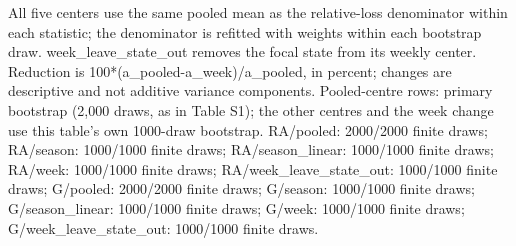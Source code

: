 \vspace{-.5\baselineskip}
\begin{minipage}{\linewidth}\footnotesize\raggedright
All five centers use the same pooled mean as the relative-loss denominator within each statistic; the denominator is refitted with weights within each bootstrap draw. week\_\allowbreak{}leave\_\allowbreak{}state\_\allowbreak{}out removes the focal state from its weekly center. Reduction is 100*(a\_\allowbreak{}pooled-a\_\allowbreak{}week)/a\_\allowbreak{}pooled, in percent; changes are descriptive and not additive variance components. Pooled-centre rows: primary bootstrap (2,000 draws, as in Table S1); the other centres and the week change use this table's own 1000-draw bootstrap. RA/pooled: 2000/2000 finite draws; RA/season: 1000/1000 finite draws; RA/season\_\allowbreak{}linear: 1000/1000 finite draws; RA/week: 1000/1000 finite draws; RA/week\_\allowbreak{}leave\_\allowbreak{}state\_\allowbreak{}out: 1000/1000 finite draws; G/pooled: 2000/2000 finite draws; G/season: 1000/1000 finite draws; G/season\_\allowbreak{}linear: 1000/1000 finite draws; G/week: 1000/1000 finite draws; G/week\_\allowbreak{}leave\_\allowbreak{}state\_\allowbreak{}out: 1000/1000 finite draws.
\end{minipage}\par
\endgroup
